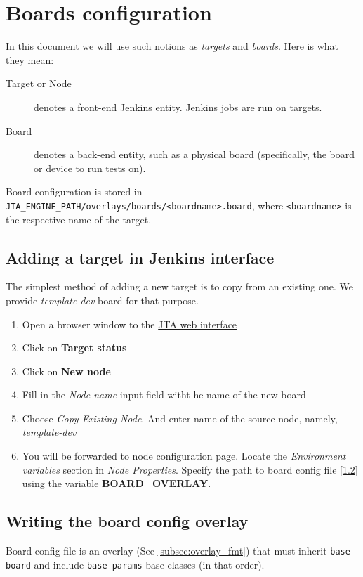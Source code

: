 \section{Boards configuration}
In this document we will use such notions as \textit{targets} and \textit{boards}. Here is what they mean:
\begin{description}
\item[Target or Node] denotes a front-end Jenkins entity. Jenkins jobs are run on targets.
\item[Board] denotes a back-end entity, such as a physical board (specifically, the board or device to run tests on).
\end{description}

Board configuration is stored in \texttt{JTA\_ENGINE\_PATH/overlays/boards/<boardname>.board}, 
where \texttt{<boardname>} is the respective name of the target.

\subsection{Adding a target in Jenkins interface}
\label{sec:target-add}
The simplest method of adding a new target is to copy from an existing one. 
We provide \textit{template-dev} board for that purpose.
\begin{enumerate}
\item Open a browser window to the \href{http://localhost:8080/}{JTA web interface}
\item Click on \textbf{Target status}
\item Click on \textbf{New node}
\item Fill in the \textit{Node name} input field witht he name of the new board
\item Choose \textit{Copy Existing Node}. And enter name of the source node, namely, \textit{template-dev}
\item You will be forwarded to node configuration page.
Locate the \textit{Environment variables} section in \textit{Node Properties}.
Specify the path to board config file [\ref{sec:board_config}] using the variable \textbf{BOARD\_OVERLAY}.
\end{enumerate}

\subsection{Writing the board config overlay}
\label{sec:board_config}
Board config file is an overlay (See \ref{subsec:overlay_fmt}) that must inherit \texttt{base-board} and include \texttt{base-params} base classes (in that order).

